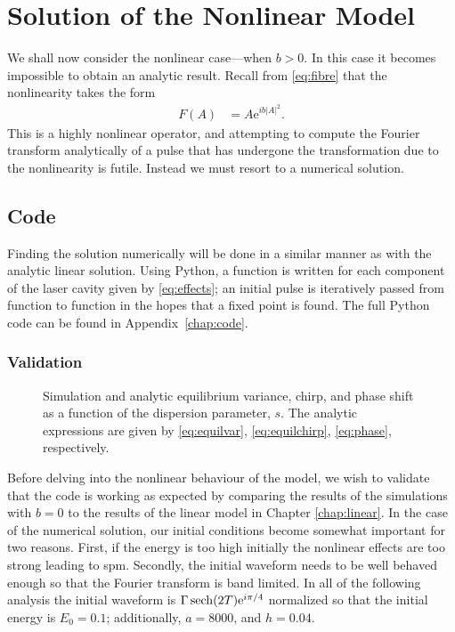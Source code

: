 
\chapter{Solution of the Nonlinear Model}
\label{chap:nl}
We shall now consider the nonlinear case---when $b > 0$. In this case it becomes impossible to obtain an analytic result. Recall from \eqref{eq:fibre} that the nonlinearity takes the form
\begin{align*}
F(A) &= A \textrm{e}^{i b |A|^2}.
\end{align*}
This is a highly nonlinear operator, and attempting to compute the Fourier transform analytically of a pulse that has undergone the transformation due to the nonlinearity is futile. Instead we must resort to a numerical solution. \\

\section{Code}
Finding the solution numerically will be done in a similar manner as with the analytic linear solution. Using Python, a function is written for each component of the laser cavity given by \eqref{eq:effects}; an initial pulse is iteratively passed from function to function in the hopes that a fixed point is found. The full Python code can be found in Appendix~\ref{chap:code}. \\

\subsection{Validation}
\begin{figure}[tbp]
\centering

\caption[Equilibrium variance, chirp, and phase shift of the pulse as a function of the dispersion parameter.]{Simulation and analytic equilibrium variance, chirp, and phase shift as a function of the dispersion parameter, $s$. The analytic expressions are given by \eqref{eq:equilvar}, \eqref{eq:equilchirp}, \eqref{eq:phase}, respectively.}
\label{fig:var}
\end{figure}
Before delving into the nonlinear behaviour of the model, we wish to validate that the code is working as expected by comparing the results of the simulations with $b=0$ to the results of the linear model in Chapter \ref{chap:linear}. In the case of the numerical solution, our initial conditions become somewhat important for two reasons. First, if the energy is too high initially the nonlinear effects are too strong leading to \acrlong{spm}. Secondly, the initial waveform needs to be well behaved enough so that the Fourier transform is band limited. In all of the following analysis the initial waveform is $\Gamma \sech \left( 2T \right) \textrm{e}^{i \pi / 4}$ normalized so that the initial energy is $E_0 = 0.1$; additionally, $a = 8000$, and $h = 0.04$. \\

